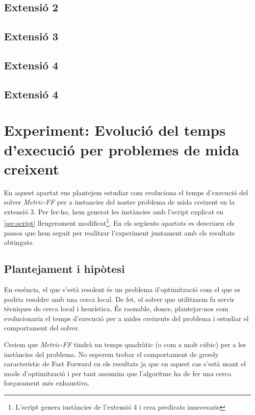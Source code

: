 \documentclass[11pt,a4paper]{article}
\begin{document}
\subsection{Extensió 2}
\subsection{Extensió 3}
\subsection{Extensió 4}
\subsection{Extensió 4}

\section[Experiment extra]{Experiment: Evolució del temps d'execució per problemes de mida creixent}
\label{sec:experiment}

En aquest apartat ens plantejem estudiar com evoluciona el temps d'execució del solver \emph{Metric-FF} per a instancies del nostre problema de mida creixent en la extensió 3. Per fer-ho, hem generat les instàncies amb l'script explicat en \ref{sec:script} lleugerament modificat\footnote{L'script genera instàncies de l'extensió 4 i crea predicats innecesaris}. En els següents apartats es descriuen els passos que hem seguit per realitzar l'experiment juntament amb els resultats obtinguts.

\subsection{Plantejament i hipòtesi}

En essència, el que s'està resolent és un problema d'optimització com el que es podria resoldre amb una cerca local. De fet, el solver que utilitzaem fa servir tècniques de cerca local i heurística. És raonable, doncs, plantejar-nos com evolucionaria el temps d'execució per a mides creixents del problema i estudiar el comportament del solver. 

Creiem que \emph{Metric-FF} tindrà un temps quadràtic (o com a molt cúbic) per a les instàncies del problema. No esperem trobar el comportament de greedy característic de Fast Forward en els resultats ja que en aquest cas s'està usant el mode d'optimització i per tant assumim que l'algoritme ha de fer una cerca forçosament més exhaustiva.
\end{document}
